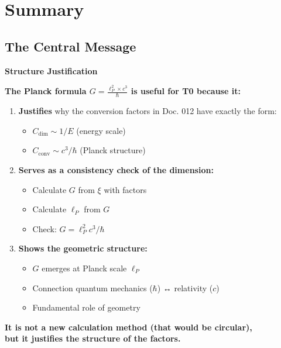 	\section{Summary}
	
	\subsection{The Central Message}
	
	\begin{key}
		\textbf{Structure Justification}\par\medskip
		\textbf{The Planck formula $G = \frac{\ell_P^2 \times c^3}{\hbar}$ is useful for T0 because it:}
		
		\begin{enumerate}
			\item \textbf{Justifies} why the conversion factors in Doc. 012 have exactly the form:
			\begin{itemize}
				\item $C_{\text{dim}} \sim 1/E$ (energy scale)
				\item $C_{\text{conv}} \sim c^3/\hbar$ (Planck structure)
			\end{itemize}
			
			\item \textbf{Serves as a consistency check of the dimension:}
			\begin{itemize}
				\item Calculate $G$ from $\xi$ with factors
				\item Calculate $\ell_P$ from $G$
				\item Check: $G = \ell_P^2 c^3/\hbar$
			\end{itemize}
			
			\item \textbf{Shows the geometric structure:}
			\begin{itemize}
				\item $G$ emerges at Planck scale $\ell_P$
				\item Connection quantum mechanics ($\hbar$) ↔ relativity ($c$)
				\item Fundamental role of geometry
			\end{itemize}
		\end{enumerate}
		
		\textbf{It is not a new calculation method (that would be circular), \\
			but it justifies the structure of the factors.}
	\end{key}
	
